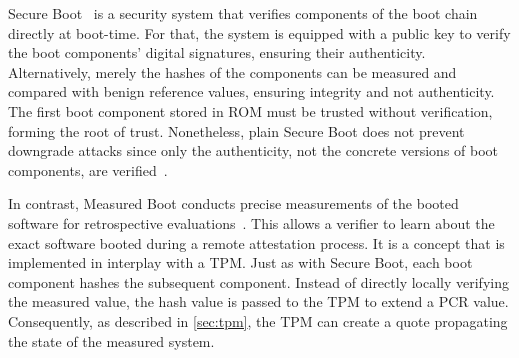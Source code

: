 
Secure Boot~\cite{Hendricks2004, UEFI, Frazelle2020} is a security system that verifies components of the boot chain directly at boot-time.
For that, the system is equipped with a public key to verify the boot components' digital signatures, ensuring their authenticity.
Alternatively, merely the hashes of the components can be measured and compared with benign reference values, ensuring integrity and not authenticity.
The first boot component stored in ROM must be trusted without verification, forming the root of trust.
Nonetheless, plain Secure Boot does not prevent downgrade attacks since only the authenticity, not the concrete versions of boot components, are verified~\cite{272306}.


In contrast, Measured Boot conducts precise measurements of the booted software for retrospective evaluations~\cite{tcgMeasuredBoot}.
This allows a verifier to learn about the exact software booted during a remote attestation process.
It is a concept that is implemented in interplay with a TPM\@.
Just as with Secure Boot, each boot component hashes the subsequent component.
Instead of directly locally verifying the measured value, the hash value is passed to the TPM to extend a \ac{PCR} value.
Consequently, as described in \autoref{sec:tpm}, the TPM can create a quote propagating the state of the measured system.

